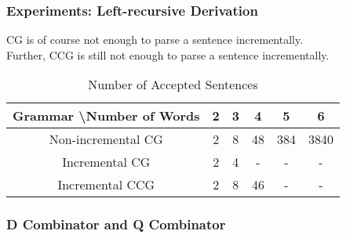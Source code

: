 \documentclass[aspectratio=169]{beamer}
\begin{document}
\begin{frame}[t]
	\frametitle{Experiments: Left-recursive Derivation}
	CG is of course not enough to parse a sentence incrementally. \\
	Further, CCG is still not enough to parse a sentence incrementally.
	\begin{table}[htpb]
		\centering
		\caption{Number of Accepted Sentences}
		\label{tab:icg-iccg}
		\begin{tabular}{c|ccccc}
			Grammar \textbackslash Number of Words & 2 & 3 & 4  & 5   & 6    \\
			\hline\hline
			Non-incremental CG                     & 2 & 8 & 48 & 384 & 3840 \\
			\hline
			Incremental CG                         & 2 & 4 & -  & -   & -    \\
			Incremental CCG                        & 2 & 8 & 46 & -   & -    \\
		\end{tabular}
	\end{table}
\end{frame}
\begin{frame}[t]
	\frametitle{D Combinator and Q Combinator}
\end{frame}
\end{document}
